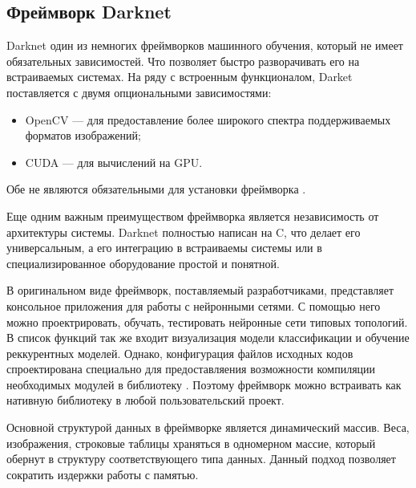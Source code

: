 \documentclass[a4paper,english,russian]{G2-105}
\begin{document}
\subsection{Фреймворк Darknet} \ttl
\par Darknet один из немногих фреймворков машинного обучения, который не имеет обязательных зависимостей. Что позволяет быстро разворачивать его на встраиваемых системах. На ряду с встроенным функционалом, Darket поставляется с двумя опциональными зависимостями:
\begin{itemize}
\item OpenCV --- для предоставление более широкого спектра поддерживаемых форматов изображений;
\item CUDA --- для вычислений на GPU. 
\end{itemize}
\par Обе не являются обязательными для установки фреймворка \cite{14}.
\par Еще одним важным преимуществом фреймворка является независимость от архитектуры системы. Darknet полностью написан на C, что делает его универсальным, а его интеграцию в встраиваемы системы или в специализированное оборудование простой и понятной. 
\par В оригинальном виде фреймворк, поставляемый разработчиками, представляет консольное приложения для работы с нейронными сетями. С помощью него можно проектрировать, обучать, тестировать нейронные сети типовых топологий. В список функций так же входит визуализация модели классификации и обучение реккурентных моделей. Однако, конфигурация файлов исходных кодов спроектирована специально для предоставляения возможности компиляции необходимых модулей в библиотеку \cite{15}. Поэтому фреймворк можно встраивать как нативную библиотеку в любой пользовательский проект.
\par Основной структурой данных в фреймворке является динамический массив. Веса, изображения, строковые таблицы храняться в одномерном массие, который обернут в структуру соответствующего типа данных. Данный подход позволяет сократить издержки работы с памятью.
\ttl
\end{document}

